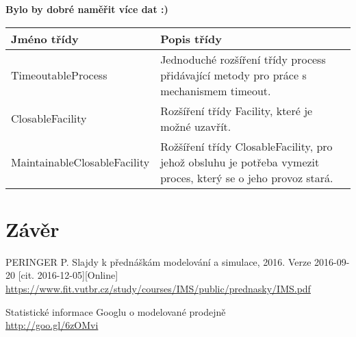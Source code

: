 \documentclass[12pt,a4paper,titlepage]{article}
\begin{document}
\textbf{Bylo by dobré naměřit více dat :) }


\begin{center}
    \begin{tabular}{| l | l | }
    \hline
    Jméno  třídy & Popis třídy  \\ \hline
    TimeoutableProcess & Jednoduché rozšíření třídy process přidávající metody pro práce s mechanismem timeout. \\ \hline
    ClosableFacility &  Rozšíření třídy Facility, které je možné uzavřít. \\ \hline
    MaintainableClosableFacility & Rožšíření třídy ClosableFacility, pro jehož obsluhu je potřeba vymezit proces, který se o jeho provoz stará.  \\
    \hline
    \end{tabular}
\end{center}


\section{Závěr}
\begin{enumerate}[label={[\arabic*]}]
\item PERINGER P. Slajdy k přednáškám modelování a simulace, 2016. Verze  2016-09-20 [cit. 2016-12-05][Online] \\ 
     \href{https://www.fit.vutbr.cz/study/courses/IMS/public/prednasky/IMS.pdf}
          {https://www.fit.vutbr.cz/study/courses/IMS/public/prednasky/IMS.pdf}
     \label{prezentace}
\item Statistické informace Googlu o modelované prodejně \\
     \href{http://goo.gl/6zOMvi}
          {http://goo.gl/6zOMvi} 
     \label{google-shop}
\end{enumerate}
\end{document}
